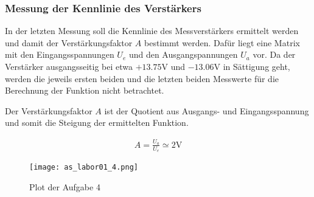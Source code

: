 \subsubsection{Messung der Kennlinie des Verstärkers}

In der letzten Messung soll die Kennlinie des Messverstärkers ermittelt
werden und damit der Verstärkungsfaktor $A$ bestimmt werden. Dafür liegt
eine Matrix mit den Eingangsspannungen $U_e$ und den Ausgangspannungen
$U_a$ vor. Da der Verstärker ausgangsseitig bei etwa $+13.75\mathrm{V}$
und $-13.06\mathrm{V}$ in Sättigung geht, werden die jeweils ersten beiden
und die letzten beiden Messwerte für die Berechnung der Funktion nicht
betrachtet.

Der Verstärkungsfaktor $A$ ist der Quotient aus Ausgangs- und Eingangsspannung
und somit die Steigung der ermittelten Funktion.

\begin{equation} \label{eq141}
    \begin{split}
        A=\frac{U_a}{U_e}\simeq2 \mathrm{V}
    \end{split}
\end{equation}

\begin{figure}[H]
 \centering
 \texttt{[image: as\_labor01\_4.png]}
 \caption{Plot der Aufgabe 4}
 \label{fig:PlotAufgabe4}
\end{figure}